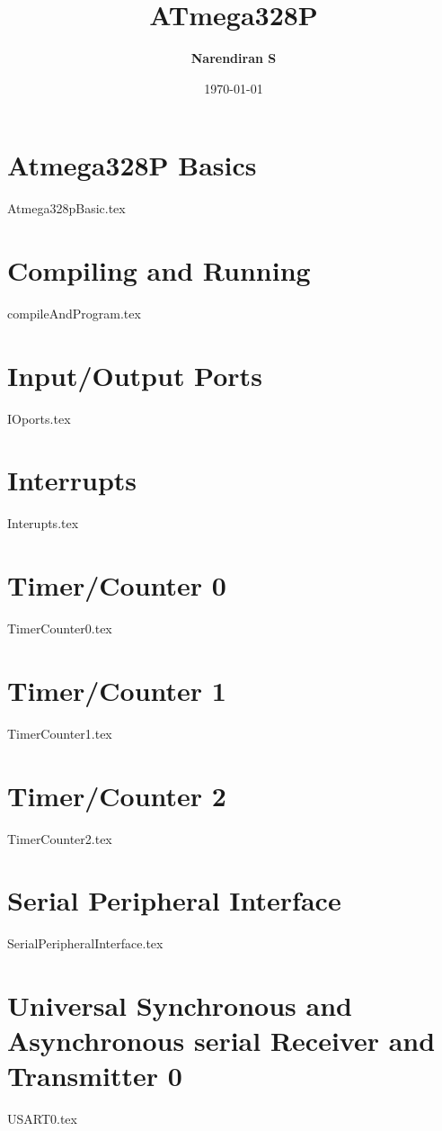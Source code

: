 \documentclass[oneside]{book}
\title{\Huge \textbf{ATmega328P}}
\author{\textbf{Narendiran S}}
\date{\today}
\begin{document}
\maketitle

\tableofcontents

\chapter{Atmega328P Basics}
{Atmega328pBasic.tex}
% 

\chapter{Compiling and Running}
{compileAndProgram.tex}

\chapter{Input/Output Ports}
{IOports.tex}

\chapter{Interrupts}
{Interupts.tex}


\chapter{Timer/Counter 0}
{TimerCounter0.tex}

\chapter{Timer/Counter 1}
{TimerCounter1.tex}

\chapter{Timer/Counter 2}
{TimerCounter2.tex}

\chapter{Serial Peripheral Interface}
{SerialPeripheralInterface.tex}

\chapter{Universal Synchronous and Asynchronous serial Receiver and Transmitter 0}
{USART0.tex}
\end{document}
